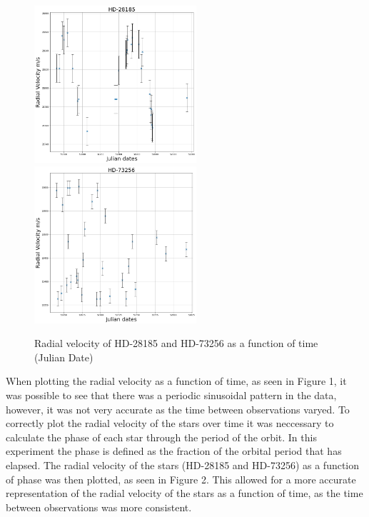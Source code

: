\documentclass[]{article}
\begin{document}
\begin{figure}[h]
\includegraphics[width=6cm]{images/HD-28185_init.png}
\includegraphics[width=6cm]{images/HD-73256_init.png}
\caption{Radial velocity of HD-28185 and HD-73256 as a function of time (Julian Date)}
\label{fig:HD-_init}
\end{figure}

When plotting the radial velocity as a function of time, as seen in Figure 1, it was
possible to see that there was a periodic sinusoidal pattern in the data, however, 
it was not very accurate as the time between observations varyed.
To correctly plot the radial velocity of the stars over time it was neccessary 
to calculate the phase of each star through the period of the orbit. In this experiment
the phase is defined as the fraction of the orbital period that has elapsed.
The radial velocity of the stars (HD-28185 and HD-73256) as a function of phase 
was then plotted, as seen in Figure 2. This allowed for a more accurate representation
of the radial velocity of the stars as a function of time, as the time between 
observations was more consistent.
\par
\newpage
\end{document}
